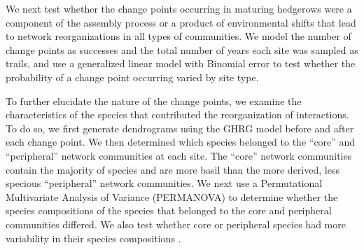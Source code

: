 \documentclass[12pt]{article}
\begin{document}
We next test whether the change points occurring in maturing hedgerows
were a component of the assembly process or a product of environmental
shifts that lead to network reorganizations in all types of
communities. We model the number of change points as successes and the
total number of years each site was sampled as trails, and use a
generalized linear model with Binomial error to test whether the
probability of a change point occurring varied by site type.

To further elucidate the nature of the change points, we examine the
characteristics of the species that contributed the reorganization of
interactions. To do so, we first generate dendrograms using the GHRG
model before and after each change point.  We then determined which
species belonged to the ``core'' and ``peripheral'' network
communities at each site. The ``core'' network communities contain the
majority of species and are more basil than the more derived, less
specious ``peripheral'' network communities. We next use a
Permutational Multivariate Analysis of Variance (PERMANOVA)
\citep{anderson-2013-557} to determine whether the species
compositions of the species that belonged to the core and peripheral
communities differed. We also test whether core or peripheral species
had more variability in their species compositions \citep[i.e.,
multivariate dispersion, ][]{anderson-2011-19,
  anderson-2006-683}. 

\end{document}
